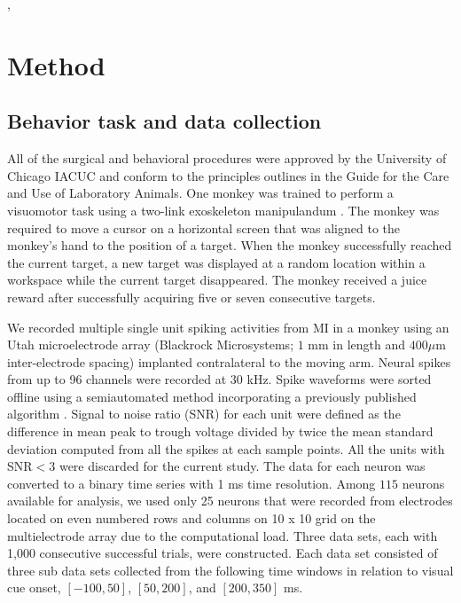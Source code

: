 \documentclass[a4paper]{jpconf}
\begin{document}
\cite{doug2006betawave}, \cite{taka2011humanbetawave}

\section{Method}
\label{sec:method}

\subsection{Behavior task and data collection}

All of the surgical and behavioral procedures were approved by the
University of Chicago IACUC and conform to the principles outlines
in the Guide for the Care and Use of Laboratory Animals. One
monkey was trained to perform a visuomotor task using a two-link
exoskeleton manipulandum \cite{ref:Scott99}. The monkey was
required to move a cursor on a horizontal screen that was aligned
to the monkey's hand to the position of a target. When the monkey
successfully reached the current target, a new target was
displayed at a random location within a workspace while the
current target disappeared. The monkey received a juice reward
after successfully acquiring five or seven consecutive targets.

We recorded multiple single unit spiking activities from MI in
a monkey using an Utah microelectrode array (Blackrock
Microsystems; $1$ mm in length and $400 \mu$m inter-electrode
spacing) implanted contralateral to the moving arm. Neural
spikes from up to 96 channels were recorded at $30$ kHz. Spike
waveforms were sorted offline using a semiautomated method
incorporating a previously published algorithm
\cite{ref:VargasIrwin2007}. Signal to noise ratio (SNR) for each
unit were defined as the difference in mean peak to trough voltage
divided by twice the mean standard deviation computed from all the
spikes at each sample points. All the units with SNR$<3$ were
discarded for the current study. The data for each neuron was
converted to a binary time series with 1 ms time resolution. Among
$115$ neurons available for analysis, we used only 25 neurons that
were recorded from electrodes located on even numbered rows and
columns on 10 x 10 grid on the multielectrode array due to the
computational load. Three data sets, each with 1,000 consecutive
successful trials, were constructed. Each data set consisted of
three sub data sets collected from the following time windows in
relation to visual cue onset, $[-100, 50]$, $[50, 200]$, and
$[200, 350]$ ms.
\end{document}
